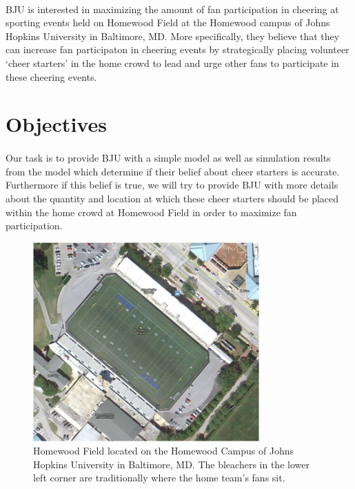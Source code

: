 \documentclass[12pt,letterpaper]{article}
\theoremstyle{definition}
\begin{document}
\paragraph{}
BJU is interested in maximizing the amount of fan participation in cheering at sporting events held on Homewood Field at the Homewood campus of Johns Hopkins University in Baltimore, MD. More specifically, they believe that they can increase fan participaton in cheering events by strategically placing volunteer `cheer starters' in the home crowd to lead and urge other fans to participate in these cheering events.

\section{Objectives}
\paragraph{}
Our task is to provide BJU with a simple model as well as simulation results from the model which determine if their belief about cheer starters is accurate. Furthermore if this belief is true, we will try to provide BJU with more details about the quantity and location at which these cheer starters should be placed within the home crowd at Homewood Field in order to maximize fan participation.

\begin{figure}[h]
	\begin{center}
			\includegraphics[height=3in] {HomewoodField.png}
	\end{center}
	\caption{Homewood Field located on the Homewood Campus of Johns Hopkins University in Baltimore, MD. The bleachers in the lower left corner are traditionally where the home team's fans sit.}
	\label{fig:homewoodfield}
\end{figure}
\end{document}
